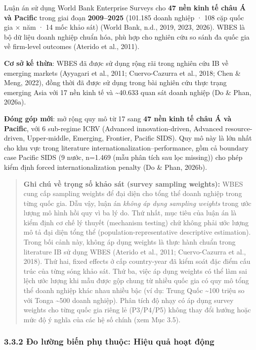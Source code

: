\documentclass[12pt,a4paper]{article}
\begin{document}
Luận án sử dụng World Bank Enterprise Surveys cho \textbf{47 nền kinh tế
châu Á và Pacific} trong giai đoạn \textbf{2009--2025} (101.185 doanh
nghiệp · 108 cặp quốc gia × năm · 14 mốc khảo sát) (World Bank, n.d.,
2019, 2023, 2026). WBES là bộ dữ liệu doanh nghiệp chuẩn hóa, phù hợp
cho nghiên cứu so sánh đa quốc gia về firm-level outcomes (Aterido et
al., 2011).

\textbf{Cơ sở kế thừa}: WBES đã được sử dụng rộng rãi trong nghiên cứu
IB về emerging markets (Ayyagari et al., 2011; Cuervo-Cazurra et al.,
2018; Chen \& Meng, 2022), đồng thời đã được sử dụng trong bài nghiên
cứu thực trạng emerging Asia với 17 nền kinh tế và \textasciitilde40.633
quan sát doanh nghiệp (Do \& Phan, 2026a).

\textbf{Đóng góp mới}: mở rộng quy mô từ 17 sang \textbf{47 nền kinh tế
châu Á và Pacific}, với 6 sub-regime ICRV (Advanced innovation-driven,
Advanced resource-driven, Upper-middle, Emerging, Frontier, Pacific
SIDS). Quy mô này là lớn nhất cho khu vực trong literature
internationalization--performance, gồm cả boundary case Pacific SIDS (9
nước, n=1.469 (mẫu phân tích sau lọc missing)) cho phép kiểm định forced
internationalization penalty (Do \& Phan, 2026b).

\begin{quote}
\textbf{Ghi chú về trọng số khảo sát (survey sampling weights):} WBES
cung cấp sampling weights để đại diện cho tổng thể doanh nghiệp trong
từng quốc gia. Dẫu vậy, luận án \emph{không áp dụng sampling weights}
trong ước lượng mô hình hồi quy vì ba lý do. Thứ nhất, mục tiêu của luận
án là kiểm định cơ chế lý thuyết (mechanism testing) chứ không phải ước
lượng mô tả đại diện tổng thể (population-representative descriptive
estimation). Trong bối cảnh này, không áp dụng weights là thực hành
chuẩn trong literature IB sử dụng WBES (Aterido et al., 2011;
Cuervo-Cazurra et al., 2018). Thứ hai, fixed effects ở cấp country-year
đã kiểm soát đặc điểm cấu trúc của từng sóng khảo sát. Thứ ba, việc áp
dụng weights có thể làm sai lệch ước lượng khi mẫu được gộp chung từ
nhiều quốc gia có quy mô tổng thể doanh nghiệp khác nhau nhiều bậc (ví
dụ: Trung Quốc \textasciitilde100 triệu so với Tonga \textasciitilde500
doanh nghiệp). Phân tích độ nhạy có áp dụng survey weights cho từng quốc
gia riêng lẻ (P3/P4/P5) không thay đổi hướng hoặc mức độ ý nghĩa của các
hệ số chính (xem Mục 3.5).
\end{quote}

\hypertarget{332-ux111o-lux1b0ux1eddng-biux1ebfn-phux1ee5-thuux1ed9c-hiux1ec7u-quux1ea3-houx1ea1t-ux111ux1ed9ng}{%
\subsubsection{3.3.2 Đo lường biến phụ thuộc: Hiệu quả hoạt
động}\label{332-ux111o-lux1b0ux1eddng-biux1ebfn-phux1ee5-thuux1ed9c-hiux1ec7u-quux1ea3-houx1ea1t-ux111ux1ed9ng}}
\end{document}
